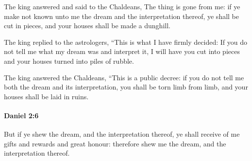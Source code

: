 			\begin{versebox}
					\item[BHS] 
					\item[LXX] 
					\item[ASV] The king answered and said to the Chaldeans, The thing is gone from me: if ye make not known unto me the dream and the interpretation thereof, ye shall be cut in pieces, and your houses shall be made a dunghill.
					\item[NIV] The king replied to the astrologers, “This is what I have firmly decided: If you do not tell me what my dream was and interpret it, I will have you cut into pieces and your houses turned into piles of rubble.
					\item[NRSV] The king answered the Chaldeans, “This is a public decree: if you do not tell me both the dream and its interpretation, you shall be torn limb from limb, and your houses shall be laid in ruins.
			\end{versebox}

		\paragraph{Daniel 2:6} %
			\label{DANIEL-2-6}

			But if ye shew the dream, and the interpretation thereof, ye shall receive of me gifts and rewards and great honour: therefore shew me the dream, and the interpretation thereof.

